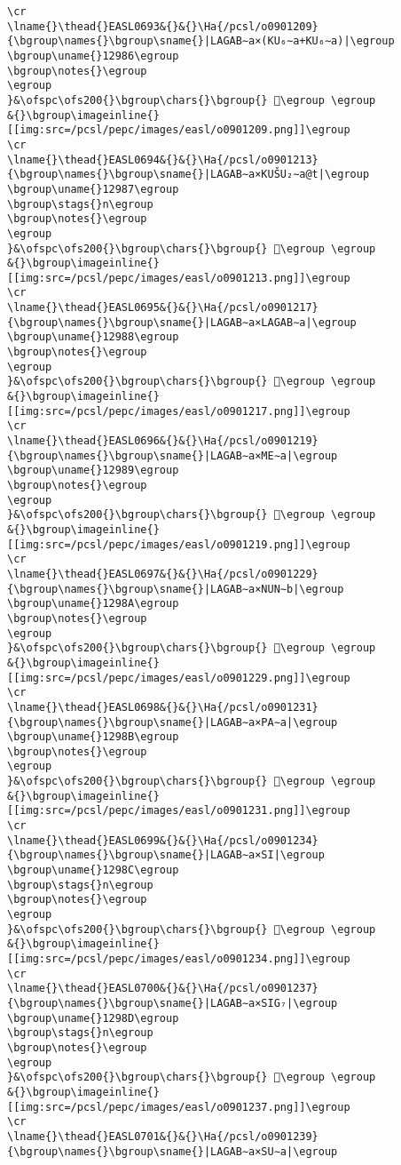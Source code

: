 \begin{verbatim}
\cr
\lname{}\thead{}EASL0693&{}&{}\Ha{/pcsl/o0901209}{\bgroup\names{}\bgroup\sname{}|LAGAB∼a×(KU₆∼a+KU₆∼a)|\egroup
\bgroup\uname{}12986\egroup
\bgroup\notes{}\egroup
\egroup
}&\ofspc\ofs200{}\bgroup\chars{}\bgroup{} 𒦆\egroup \egroup
&{}\bgroup\imageinline{}[[img:src=/pcsl/pepc/images/easl/o0901209.png]]\egroup
\cr
\lname{}\thead{}EASL0694&{}&{}\Ha{/pcsl/o0901213}{\bgroup\names{}\bgroup\sname{}|LAGAB∼a×KUŠU₂∼a@t|\egroup
\bgroup\uname{}12987\egroup
\bgroup\stags{}n\egroup
\bgroup\notes{}\egroup
\egroup
}&\ofspc\ofs200{}\bgroup\chars{}\bgroup{} 𒦇\egroup \egroup
&{}\bgroup\imageinline{}[[img:src=/pcsl/pepc/images/easl/o0901213.png]]\egroup
\cr
\lname{}\thead{}EASL0695&{}&{}\Ha{/pcsl/o0901217}{\bgroup\names{}\bgroup\sname{}|LAGAB∼a×LAGAB∼a|\egroup
\bgroup\uname{}12988\egroup
\bgroup\notes{}\egroup
\egroup
}&\ofspc\ofs200{}\bgroup\chars{}\bgroup{} 𒦈\egroup \egroup
&{}\bgroup\imageinline{}[[img:src=/pcsl/pepc/images/easl/o0901217.png]]\egroup
\cr
\lname{}\thead{}EASL0696&{}&{}\Ha{/pcsl/o0901219}{\bgroup\names{}\bgroup\sname{}|LAGAB∼a×ME∼a|\egroup
\bgroup\uname{}12989\egroup
\bgroup\notes{}\egroup
\egroup
}&\ofspc\ofs200{}\bgroup\chars{}\bgroup{} 𒦉\egroup \egroup
&{}\bgroup\imageinline{}[[img:src=/pcsl/pepc/images/easl/o0901219.png]]\egroup
\cr
\lname{}\thead{}EASL0697&{}&{}\Ha{/pcsl/o0901229}{\bgroup\names{}\bgroup\sname{}|LAGAB∼a×NUN∼b|\egroup
\bgroup\uname{}1298A\egroup
\bgroup\notes{}\egroup
\egroup
}&\ofspc\ofs200{}\bgroup\chars{}\bgroup{} 𒦊\egroup \egroup
&{}\bgroup\imageinline{}[[img:src=/pcsl/pepc/images/easl/o0901229.png]]\egroup
\cr
\lname{}\thead{}EASL0698&{}&{}\Ha{/pcsl/o0901231}{\bgroup\names{}\bgroup\sname{}|LAGAB∼a×PA∼a|\egroup
\bgroup\uname{}1298B\egroup
\bgroup\notes{}\egroup
\egroup
}&\ofspc\ofs200{}\bgroup\chars{}\bgroup{} 𒦋\egroup \egroup
&{}\bgroup\imageinline{}[[img:src=/pcsl/pepc/images/easl/o0901231.png]]\egroup
\cr
\lname{}\thead{}EASL0699&{}&{}\Ha{/pcsl/o0901234}{\bgroup\names{}\bgroup\sname{}|LAGAB∼a×SI|\egroup
\bgroup\uname{}1298C\egroup
\bgroup\stags{}n\egroup
\bgroup\notes{}\egroup
\egroup
}&\ofspc\ofs200{}\bgroup\chars{}\bgroup{} 𒦌\egroup \egroup
&{}\bgroup\imageinline{}[[img:src=/pcsl/pepc/images/easl/o0901234.png]]\egroup
\cr
\lname{}\thead{}EASL0700&{}&{}\Ha{/pcsl/o0901237}{\bgroup\names{}\bgroup\sname{}|LAGAB∼a×SIG₇|\egroup
\bgroup\uname{}1298D\egroup
\bgroup\stags{}n\egroup
\bgroup\notes{}\egroup
\egroup
}&\ofspc\ofs200{}\bgroup\chars{}\bgroup{} 𒦍\egroup \egroup
&{}\bgroup\imageinline{}[[img:src=/pcsl/pepc/images/easl/o0901237.png]]\egroup
\cr
\lname{}\thead{}EASL0701&{}&{}\Ha{/pcsl/o0901239}{\bgroup\names{}\bgroup\sname{}|LAGAB∼a×SU∼a|\egroup

\end{verbatim}
